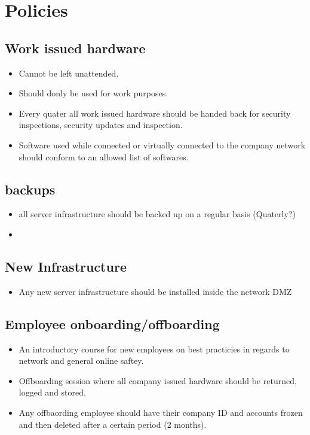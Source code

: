 \chapter{Policies}

\section{Work issued hardware}
\begin{itemize}
    \item Cannot be left unattended.
    \item Should donly be used for work purposes.
    \item Every quater all work issued hardware should be handed back for security inspections, security updates and inspection.
    \item Software used while connected or virtually connected to the company network should conform to an allowed list of softwares.
\end{itemize}

\section{backups}
\begin{itemize}
    \item all server infrastructure should be backed up on a regular basis (Quaterly?)
    \item 
\end{itemize}

\section{New Infrastructure}
\begin{itemize}
    \item Any new server infrastructure should be installed inside the network DMZ
\end{itemize}

\section{Employee onboarding/offboarding}
\begin{itemize}
    \item An introductory course for new employees on best practicies in regards to network and general online saftey.
    \item Offboarding session where all company issued hardware should be returned, logged and stored. 
    \item Any offbaording employee should have their company ID and accounts frozen and then deleted after a certain period (2 months).
\end{itemize}

